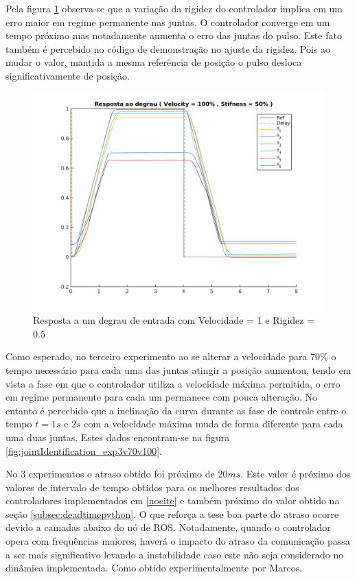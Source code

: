 Pela figura \ref{fig:jointIdentification_exp2v100v50} observa-se que a variação da rigidez do controlador implica em um erro maior em regime permanente nas juntas. O controlador converge em um tempo próximo mas notadamente aumenta o erro das juntas do pulso. Este fato também é percebido no código de demonstração no ajuste da rigidez. Pois ao mudar o valor, mantida a mesma referência de posição o pulso desloca significativamente de posição.

\begin{figure}[H]
    \centering
    \includegraphics[width=0.8\linewidth]{tex/figs/jointIdentification_exp2v100v50.png}
    \caption{Resposta a um degrau de entrada com Velocidade = 1 e Rigidez = 0.5}
    \label{fig:jointIdentification_exp2v100v50}
\end{figure}

Como esperado, no terceiro experimento ao se alterar a velocidade para $70\%$ o tempo necessário para cada uma das juntas atingir a posição aumentou, tendo em vista a fase em que o controlador utiliza a velocidade máxima permitida, o erro em regime permanente para cada um permanece com pouca alteração. No entanto é percebido que a inclinação da curva durante as fase de controle entre o tempo $t=1s$ e $2s$ com a velocidade máxima muda de forma diferente para cada uma duas juntas. Estes dados encontram-se na figura \ref{fig:jointIdentification_exp3v70v100}.

No 3 experimentos o atraso obtido foi próximo de $20ms$. Este valor é próximo dos valores de intervalo de tempo obtidos para os melhores resultados dos controladores implementados em \ref{nocite} e também próximo do valor obtido na seção \ref{subsec:deadtimepython}. O que reforça a tese boa parte do atraso ocorre devido a camadas abaixo do nó de ROS. Notadamente, quando o controlador opera com frequências maiores, haverá o impacto do atraso da comunicação passa a ser mais significativo levando a instabilidade caso este não seja considerado no dinâmica implementada. Como obtido experimentalmente por Marcos.

